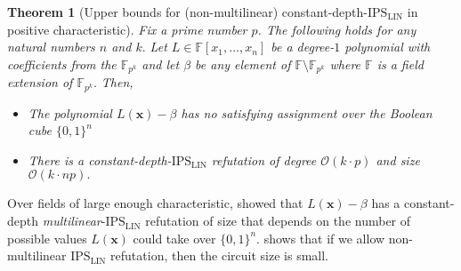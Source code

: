 \documentclass[11pt]{article}
\newtheorem{theorem}{Theorem}[section]
\newcommand{\Boo}{\{0,1 \}}
\newcommand{\bigO}{\mathcal{O}}
\newcommand{\F}{\mathbb{F}}
\newcommand{\IPSLIN}{\mathrm{IPS}_{\mathrm{LIN}}}
\begin{document}
\begin{theorem}[Upper bounds for (non-multilinear) constant-depth-$\IPSLIN$ in positive characteristic]\label{thm:ubd-const-depth-linear}
Fix a prime number $p$. The following holds for any natural numbers $n$ and $k.$\newline
Let $L \in \F[x_1,\ldots,x_n]$ be a degree-$1$ polynomial with coefficients from the $\F_{p^k}$ and let $\beta$ be any element of $\F\setminus\F_{p^k}$ where $\F$ is a field extension of $\F_{p^k}.$\newline
Then, 
\begin{itemize}
    \item The polynomial $L(\mathbf{x})-\beta$ has no satisfying assignment over the Boolean cube $\Boo^{n}$
    \item There is a constant-depth-$\IPSLIN$ refutation of degree $\bigO(k \cdot p)$ and size $\bigO(k \cdot np).$
\end{itemize}
\end{theorem}

\noindent
Over fields of large enough characteristic, \cite[Proposition 4.15]{FSTW21} showed that $L(\mathbf{x})-\beta$ has a constant-depth \emph{multilinear}-$\IPSLIN$ refutation of size that depends on the number of possible values $L(\mathbf{x})$ could take over $\Boo^{n}$.  shows that if we allow non-multilinear $\IPSLIN$ refutation, then the circuit size is small.
\end{document}
